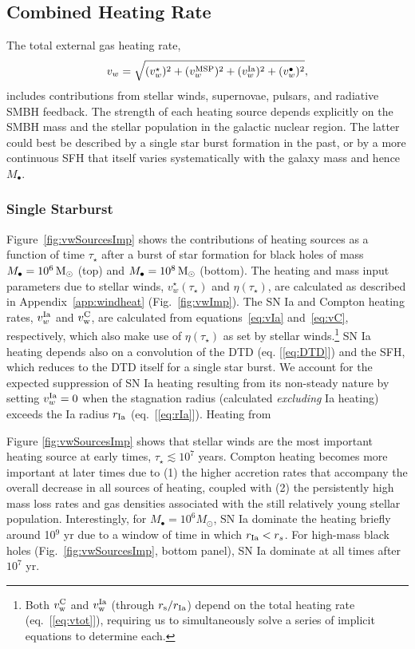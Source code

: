 \documentclass[usenatbib,fleqn]{mn2e}
\newcommand{\rs}{r_s}
\newcommand{\Mbh}[1][]{M_{\bullet#1}}
\newcommand{\vwO}{v_{w}}
\begin{document}
\subsection{Combined Heating Rate} 
\label{sec:combined}


The total external gas heating rate, 
\begin{equation}
\vwO = \sqrt{(v_{w}^{\star})^{2} + (v_{w}^{\rm MSP})^{2} + (v_{w}^{\rm Ia})^{2} + (v_{w}^{\bullet})^{2}},
\label{eq:vtot}
\end{equation}
includes contributions from stellar winds, supernovae, pulsars, and
radiative SMBH feedback.  The strength of each heating source depends
explicitly on the SMBH mass and the stellar population in the galactic
nuclear region.  The latter could best be
described by a single star burst formation in the past, or by a more
continuous SFH that itself varies systematically
with the galaxy mass and hence $\Mbh$.

\subsubsection{Single Starburst}

Figure~\ref{fig:vwSourcesImp} shows the contributions of heating
sources as a function of time $\tau_{\star}$ after a burst of star
formation for black holes of mass $\Mbh = 10^{6} \Msun$ (top) and
$\Mbh = 10^{8} \Msun$ (bottom). The heating and mass input parameters
due to stellar winds, $v_{w}^{\star}(\tau_{\star})$ and
$\eta(\tau_{\star})$, are calculated as described in
Appendix~\ref{app:windheat} (Fig.~\ref{fig:vwImp}).  The SN Ia and
Compton heating rates, $v_{w}^{\rm Ia}$ and $v_{\rm w}^{\rm C}$, are
calculated from equations~\eqref{eq:vIa} and~\eqref{eq:vC},
respectively, which also make use of $\eta(\tau_{\star})$ as set by
stellar winds.\footnote{Both $v_{\rm w}^{\rm C}$ and $v_{\rm w}^{\rm
    Ia}$ (through $r_{\rm s}/r_{\rm Ia}$) depend on the total heating
  rate (eq.~[\ref{eq:vtot}]), requiring us to simultaneously solve a
  series of implicit equations to determine each.}  SN Ia heating
depends also on a convolution of the DTD (eq. [\ref{eq:DTD}]) and the
SFH, which reduces to the DTD itself for a single star burst.  We
account for the expected suppression of SN Ia heating resulting from
its non-steady nature by setting $v_{w}^{\rm Ia} = 0$ when the
stagnation radius (calculated {\it excluding} Ia heating) exceeds the
Ia radius $r_{\rm Ia}$ (eq.~[\ref{eq:rIa}]).  Heating from

Figure \ref{fig:vwSourcesImp} shows that stellar winds are the most
important heating source at early times, $\tau_{\star} \lesssim
10^{7}$ years.  Compton heating becomes more important at later times
due to (1) the higher accretion rates that accompany the overall
decrease in all sources of heating, coupled with (2) the persistently
high mass loss rates and gas densities associated with the still
relatively young stellar population.  Interestingly, for $M_{\bullet}
= 10^{6}M_{\odot}$, SN Ia dominate the heating briefly around 10$^{9}$
yr due to a window of time in which $r_{\rm Ia} < \rs$.  For high-mass
black holes (Fig.~\ref{fig:vwSourcesImp}, bottom panel), SN Ia
dominate at all times after $10^{7}$ yr.
\end{document}
